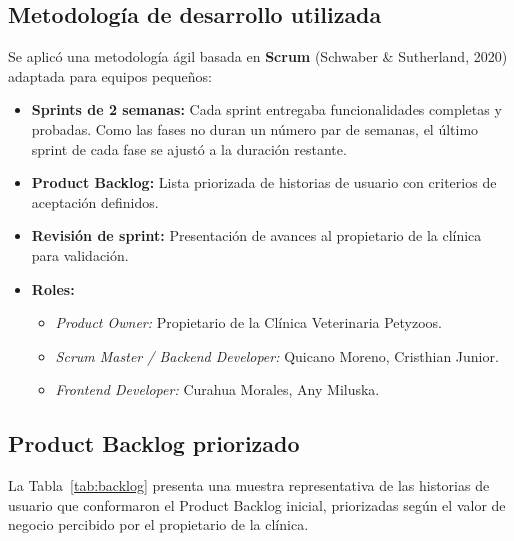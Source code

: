 \documentclass[11pt,a4paper]{report}
\begin{document}
\subsection{Metodología de desarrollo utilizada}
Se aplicó una metodología ágil basada en \textbf{Scrum} (Schwaber \& Sutherland, 2020) adaptada para equipos pequeños:
\begin{itemize}
\item \textbf{Sprints de 2 semanas:} Cada sprint entregaba funcionalidades completas y probadas. Como las fases no duran un número par de semanas, el último sprint de cada fase se ajustó a la duración restante.
\item \textbf{Product Backlog:} Lista priorizada de historias de usuario con criterios de aceptación definidos.
\item \textbf{Revisión de sprint:} Presentación de avances al propietario de la clínica para validación.
\item \textbf{Roles:}
  \begin{itemize}
  \item \textit{Product Owner:} Propietario de la Clínica Veterinaria Petyzoos.
  \item \textit{Scrum Master / Backend Developer:} Quicano Moreno, Cristhian Junior.
  \item \textit{Frontend Developer:} Curahua Morales, Any Miluska.
  \end{itemize}
\end{itemize}

\subsection{Product Backlog priorizado}
La Tabla~\ref{tab:backlog} presenta una muestra representativa de las historias de usuario que conformaron el Product Backlog inicial, priorizadas según el valor de negocio percibido por el propietario de la clínica.
\end{document}

